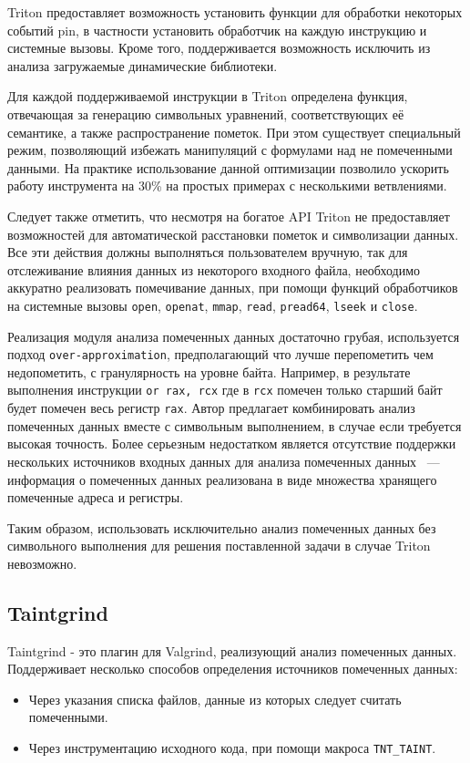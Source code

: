 Triton предоставляет возможность установить функции для обработки некоторых событий pin, в частности установить обработчик на каждую инструкцию и системные вызовы. Кроме того, поддерживается возможность исключить из анализа загружаемые динамические библиотеки.

Для каждой поддерживаемой инструкции в Triton определена функция, отвечающая за генерацию символьных уравнений, соответствующих её семантике, а также распространение пометок. При этом существует специальный режим, позволяющий избежать манипуляций с формулами над не помеченными данными. На практике использование данной оптимизации позволило ускорить работу инструмента на 30\% на простых примерах с несколькими ветвлениями.

Следует также отметить, что несмотря на богатое API Triton не предоставляет возможностей для автоматической расстановки пометок и символизации данных. Все эти действия должны выполняться пользователем вручную, так для отслеживание влияния данных из некоторого входного файла, необходимо аккуратно реализовать помечивание данных, при помощи функций обработчиков на системные вызовы \texttt{open}, \texttt{openat}, \texttt{mmap}, \texttt{read}, \texttt{pread64}, \texttt{lseek} и \texttt{close}.

Реализация модуля анализа помеченных данных достаточно грубая, используется подход 
\texttt{over-approximation}, предполагающий что лучше перепометить чем недопометить, с гранулярность на уровне байта. Например, в результате выполнения инструкции \texttt{or rax, rcx} где в \texttt{rcx} помечен только старший байт будет помечен весь регистр \texttt{rax}. Автор предлагает комбинировать анализ помеченных данных вместе с символьным выполнением, в случае если требуется высокая точность.
Более серьезным недостатком является отсутствие поддержки нескольких источников входных данных для анализа помеченных данных ~--- информация о помеченных данных реализована в виде множества хранящего помеченные адреса и регистры.

Таким образом, использовать исключительно анализ помеченных данных без символьного выполнения для решения поставленной задачи в случае Triton невозможно.

\subsection{Taintgrind}

Taintgrind\cite{Taintgrind} - это плагин для Valgrind, реализующий анализ помеченных данных. Поддерживает несколько способов определения источников помеченных данных:
\begin{itemize}
    \item Через указания списка файлов, данные из которых следует считать помеченными.
    \item Через инструментацию исходного кода, при помощи макроса \texttt{TNT\_TAINT}.
\end{itemize}

